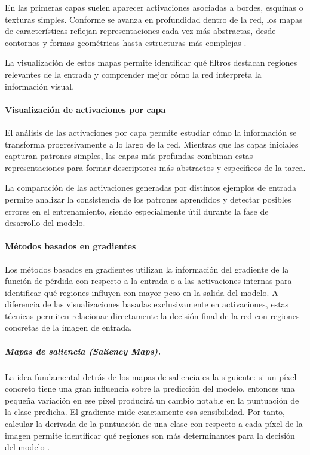 En las primeras capas suelen aparecer activaciones asociadas a bordes, esquinas o texturas
simples. Conforme se avanza en profundidad dentro de la red, los mapas de características
reflejan representaciones cada vez más abstractas, desde contornos y formas geométricas hasta
estructuras más complejas \cite{nn_dl__michael_nielsen_2015}.

La visualización de estos mapas permite identificar qué filtros destacan regiones relevantes
de la entrada y comprender mejor cómo la red interpreta la información visual.

\paragraph{Visualización de activaciones por capa}

El análisis de las activaciones por capa permite estudiar cómo la información se transforma
progresivamente a lo largo de la red. Mientras que las capas iniciales capturan patrones
simples, las capas más profundas combinan estas representaciones para formar descriptores más
abstractos y específicos de la tarea.

La comparación de las activaciones generadas por distintos ejemplos de entrada permite
analizar la consistencia de los patrones aprendidos y detectar posibles errores en el
entrenamiento, siendo especialmente útil durante la fase de desarrollo del modelo.

\paragraph{Métodos basados en gradientes}

Los métodos basados en gradientes utilizan la información del gradiente de la función de
pérdida con respecto a la entrada o a las activaciones internas para identificar qué regiones
influyen con mayor peso en la salida del modelo. A diferencia de las visualizaciones basadas
exclusivamente en activaciones, estas técnicas permiten relacionar directamente la decisión
final de la red con regiones concretas de la imagen de entrada.

\subparagraph{Mapas de saliencia (Saliency Maps).}

La idea fundamental detrás de los mapas de saliencia es la siguiente: si un píxel
concreto tiene una gran influencia sobre la predicción del modelo, entonces una pequeña
variación en ese píxel producirá un cambio notable en la puntuación de la clase predicha.
El gradiente mide exactamente esa sensibilidad. Por tanto, calcular la derivada de la
puntuación de una clase con respecto a cada píxel de la imagen permite identificar qué
regiones son más determinantes para la decisión del modelo
\cite{visualizing__simonyan__2014}.

